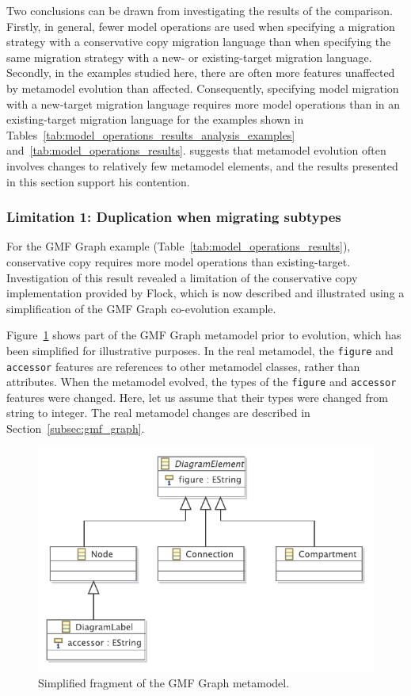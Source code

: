 Two conclusions can be drawn from investigating the results of the comparison. Firstly, in general, fewer model operations are used when specifying a migration strategy with a conservative copy migration language than when specifying the same migration strategy with a new- or existing-target migration language. Secondly, in the examples studied here, there are often more features unaffected by metamodel evolution than affected. Consequently, specifying model migration with a new-target migration language requires more model operations than in an existing-target migration language for the examples shown in Tables~\ref{tab:model_operations_results_analysis_examples} and~\ref{tab:model_operations_results}. \cite{sprinkle03thesis} suggests that metamodel evolution often involves changes to relatively few metamodel elements, and the results presented in this section support his contention.  


\subsubsection{Limitation 1: Duplication when migrating subtypes}
For the GMF Graph example (Table~\ref{tab:model_operations_results}), conservative copy requires more model operations than existing-target. Investigation of this result revealed a limitation of the conservative copy implementation provided by Flock, which is now described and illustrated using a simplification of the GMF Graph co-evolution example.

Figure~\ref{fig:subtyping} shows part of the GMF Graph metamodel prior to evolution, which has been simplified for illustrative purposes. In the real metamodel, the \texttt{figure} and \texttt{accessor} features are references to other metamodel classes, rather than attributes. When the metamodel evolved, the types of the \texttt{figure} and \texttt{accessor} features were changed. Here, let us assume that their types were changed from string to integer. The real metamodel changes are described in Section~\ref{subsec:gmf_graph}.


\begin{figure}[htbp]
  \centering
  \includegraphics[scale=0.75]{6.Evaluation/images/subtyping.pdf}
  \caption{Simplified fragment of the GMF Graph metamodel.}
  \label{fig:subtyping}
\end{figure}

